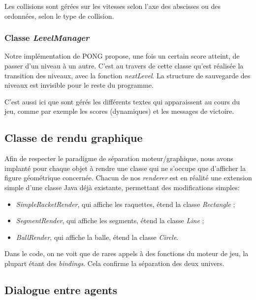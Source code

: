 \documentclass[a4paper,10pt]{article}
\theoremstyle{definition}
\begin{document}
        Les collisions sont gérées sur les vitesses selon l'axe des abscisses ou des ordonnées, selon le type de collision.
        
        \subsubsection*{Classe \emph{LevelManager}}
        Notre implémentation de PONG propose, une fois un certain score atteint, de passer d'un niveau à un autre. C'est au travers de cette classe qu'est réalisée la transition des niveaux, avec la fonction \emph{nextLevel}. La structure de sauvegarde des niveaux est invisible pour le reste du programme.
        
        C'est aussi ici que sont gérés les différents textes qui apparaissent au cours du jeu, comme par exemple les scores (dynamiques) et les messages de victoire.
        
    \subsection{Classe de rendu graphique}
    Afin de respecter le paradigme de séparation moteur/graphique, nous avons implanté pour chaque objet à rendre une classe qui ne s'occupe que d'afficher la figure géométrique concernée. Chacun de nos \emph{renderer} est en réalité une extension simple d'une classe Java déjà existante, permettant des modifications simples:
    
    \begin{itemize}
      \item \emph{SimpleRacketRender}, qui affiche les raquettes, étend la classe \emph{Rectangle} ;
      \item \emph{SegmentRender}, qui affiche les segments, étend la classe \emph{Line} ;
      \item \emph{BallRender}, qui affiche la balle, étend la classe \emph{Circle}.
    \end{itemize}
    Dans le code, on ne voit que de rares appels à des fonctions du moteur de jeu, la plupart étant des \emph{bindings}. Cela confirme la séparation des deux univers.
    
    \subsection{Dialogue entre agents}
    
\end{document}
